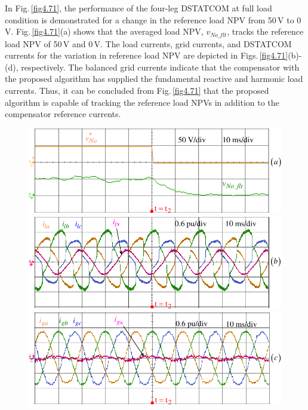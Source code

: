In Fig.\,\ref{fig4.71}, the performance of the four-leg DSTATCOM at full load condition is demonstrated for a change in the reference load NPV from 50\,V to 0\,V. Fig.\,\ref{fig4.71}(a) shows that the averaged load NPV, $v_{No\_flt}$, tracks the reference load NPV of 50\,V and 0\,V. The load currents, grid currents, and DSTATCOM currents for the variation in reference load NPV are depicted in Figs.\,\ref{fig4.71}(b)-(d), respectively. The balanced grid currents indicate that the compensator with the proposed algorithm has supplied the fundamental reactive and harmonic load currents. Thus, it can be concluded from Fig.\,\ref{fig4.71} that the proposed algorithm is capable of tracking the reference load NPVs in addition to the compensator reference currents.

\begin{figure}    
		\centering
		\includegraphics[scale=0.84]{figures/Chapter_4/Mine/LoadNPV1.pdf}\\ 
		\label{4.loadNPV}
		\centering
		\includegraphics[scale=0.84]{figures/Chapter_4/Mine/LoadCurrents1.pdf}\\ 
		\label{4.loadcurrent}
		\centering
		\includegraphics[scale=0.84]{figures/Chapter_4/Mine/SourceCurrents1.pdf}\\ 

\end{figure}
